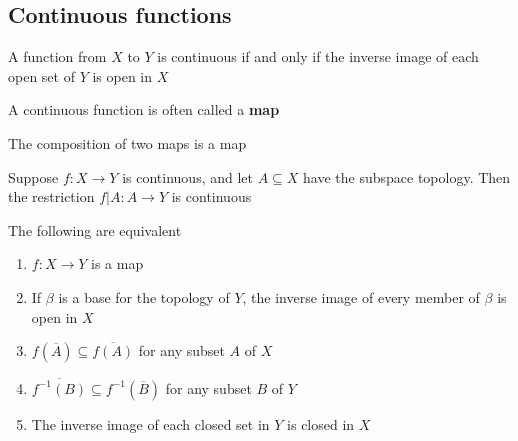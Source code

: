\documentclass[11pt]{article}
\begin{document}
\subsection{Continuous functions}
\label{sec:org15cf029}
\begin{theorem}[]
A function from \(X\) to \(Y\) is continuous if and only if the inverse image
of each open set of \(Y\) is open in \(X\)
\end{theorem}

A continuous function is often called a \textbf{map}

\begin{theorem}[]
The composition of two maps is a map
\end{theorem}

\begin{theorem}[]
Suppose \(f:X\to Y\) is continuous, and let \(A\subseteq X\) have the
subspace topology. Then the restriction \(f|A:A\to Y\) is continuous
\end{theorem}

\begin{theorem}[]
The following are equivalent
\begin{enumerate}
\item \(f:X\to Y\) is a map
\item If \(\beta\) is a base for the topology of \(Y\), the inverse image of every
member of \(\beta\) is open in \(X\)
\item \(f(\overbar{A})\subseteq\overbar{f(A)}\) for any subset \(A\) of \(X\)
\item \(\overbar{f^{-1}(B)}\subseteq f^{-1}(\overbar{B})\) for any subset \(B\)
of \(Y\)
\item The inverse image of each closed set in \(Y\) is closed in \(X\)
\end{enumerate}
\end{theorem}
\end{document}
